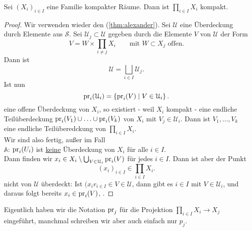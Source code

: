 \begin{theorem}\label{thm:tychonoff}
    Sei $(X_i)_{i \in I}$ eine Familie kompakter Räume. Dann ist $\prod _{i \in I} X_i$ kompakt.
\end{theorem}
\begin{proof}
    Wir verwenden wieder den  (\autoref{thm:alexander}). Sei $\mathcal{U}$ eine Überdeckung durch Elemente aus  $\mathcal{S}$. Sei $\mathcal{U}_j \subset \mathcal{U}$ gegeben durch die Elemente $V$ von  $\mathcal{U}$ der Form
    \[
    V = W \times \prod_{i\neq j} X_i \qquad \text{mit } W\subset X_j \text{ offen}
    .\] 
    Dann ist
    \[
    \mathcal{U} = \bigsqcup_{i \in  I} \mathcal{U}_j
    .\] 
    Ist nun
    \[
        \operatorname{pr}_i (\mathcal{U}_i)  = \left \{\operatorname{pr}_i(V) \mid  V\in \mathcal{U}_i\right\} 
    .\] 
    eine offene Überdeckung von $X_i$, so existiert - weil  $X_i$ kompakt - eine endliche Teilüberdeckung  $\operatorname{pr}_i(V_1)\cup \ldots\cup \operatorname{pr}_i(V_k)$ von $X_i$ mit  $V_j \in \mathcal{U}_i$. Dann ist $V_1,\ldots,V_k$ eine endliche Teilüberedckung von $\prod_{i \in I} X_i$. \\
    Wir sind also fertig, außer im Fall \\
    $\mathbb{A}$: $\operatorname{pr}_i(U_i)$ ist  \underline{keine} Überdeckung von $X_i$ für alle  $i\in I$.  \\
    Dann finden wir $x_i \in X_i \setminus \bigcup_{V\in \mathcal{U}_i} \operatorname{pr}_i(V)$ für jedes $i\in I$. Dann ist aber der Punkt
    \[
        (x_i)_{i \in I}\in \prod_{i \in I}X_i
    .\] 
    nicht von $\mathcal{U}$ überdeckt: Ist $(x_ir_{i \in I} \in V\in \mathcal{U}$, dann gibt es $i\in I$ mit $V\in \mathcal{U}_i$, und daraus folgt bereits $x_i \in \operatorname{pr}_i(V)$, \contra.
\end{proof}
\begin{remark}
    Eigentlich haben wir die Notation $\operatorname{pr}_j$ für die Projektion  $\prod _{i \in I}X_i \to  X_j$ eingeführt, manchmal schreiben wir aber auch einfach nur $p_j$.
\end{remark}
